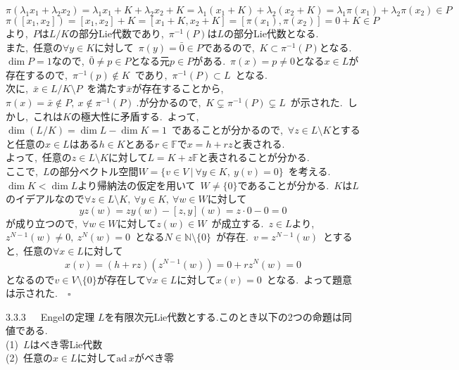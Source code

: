 \documentclass[uplatex,dvipdfmx]{jsarticle}
\begin{document}
\begin{myproof}
\begin{equation*}
    \pi(\lambda_1x_1+\lambda_2x_2)=\lambda_1x_1+K+\lambda_2 x_2 +K=\lambda_1(x_1+K)+\lambda_2(x_2+K)=\lambda_1\pi (x_1)+\lambda_2\pi (x_2)\in P
\end{equation*}
\begin{equation*}
    \pi([x_1,x_2])=[x_1,x_2]+K=[x_1+K,x_2+K]=[\pi(x_1),\pi(x_2)]=0+K \in P
\end{equation*}
より,~$P$は$L/K$の部分Lie代数であり,~$\pi^{-1}(P)$は$L$の部分Lie代数となる.\\
また,~任意の$\forall y \in K$に対して~$\pi(y)=\bar{0}\in P$であるので,~$K\subset \pi^{-1}(P)$となる.\\
$\dim P=1$なので,~$\bar{0}\neq p \in P$となる元$p\in P$がある.~$\pi(x)=p\neq 0$となる$x\in L$が存在するので,~$\pi^{-1}(p)\notin K$~であり,~$\pi^{-1}(P)\subset L$~となる.\\
次に,~$\bar{x}\in L/K \setminus P$~を満たす$\bar{x}$が存在することから,~$\pi(x)=\bar{x}\notin P,~x\notin \pi^{-1}(P)~.$が分かるので,~$K \subsetneq \pi^{-1}(P) \subsetneq L$~が示された.~しかし,~これは$K$の極大性に矛盾する.~よって,~$\dim (L/K)=\dim L -\dim K =1$~であることが分かるので,~$\forall z\in L\setminus K$とすると任意の$x\in L$はある$h\in K $とある$r\in \mathbb{F}$で$x = h+rz$と表される.\\
よって,~任意の$z\in L\setminus K$に対して$L=K+z\mathbb{F}$と表されることが分かる.\\
ここで,~$L$の部分ベクトル空間$W=\{ v\in V ~|~\forall y\in K,~y(v)=0 \}$~を考える.~$\dim K <\dim L$より帰納法の仮定を用いて~$W\neq \{0\}$であることが分かる.~$K$は$L$のイデアルなので$\forall z\in L\setminus K,~\forall y\in K,~\forall w\in W $に対して
\begin{equation*}
    yz(w)=zy(w)-[z,y](w) = z \cdot 0 -0  = 0
\end{equation*}
が成り立つので,~$\forall w \in W$に対して$z(w) \in W$~が成立する.~$z\in L $より,~$z^{N-1}(w)\neq 0,~z^N(w)=0$~となる$N\in \mathbb{N}\setminus \{0\}$~が存在.~$v= z^{N-1}(w)$~とすると,~任意の$\forall x\in L $に対して
\begin{equation*}
    x(v)=(h+rz)(z^{N-1}(w))=0+rz^N(w)=0
\end{equation*}
となるので$v\in V\setminus\{0\}$が存在して$\forall x\in L$に対して$x(v)=0$~となる.~よって題意は示された.~~$\square$
\end{myproof}
\newpage
\begin{mythm}{3.3.3~~~Engelの定理}
    $L$を有限次元Lie代数とする.このとき以下の2つの命題は同値である.\\
    (1)~$L$はべき零Lie代数\\
    (2)~任意の$x\in L$に対して$\text{ad}~x$がべき零
\end{mythm}
\end{document}
